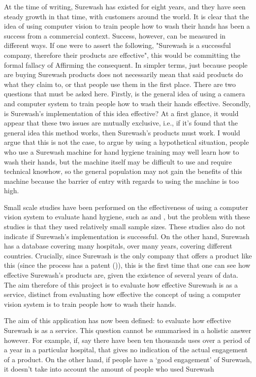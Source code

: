 At the time of writing, Surewash has existed for eight years, and they have seen steady growth in that time, with customers around the world. It is clear that the idea of using computer vision to train people how to wash their hands has been a success from a commercial context. Success, however, can be measured in different ways. If one were to assert the following, "Surewash is a successful company, therefore their products are effective", this would be committing the formal fallacy of Affirming the consequent. In simpler terms, just because people are buying Surewash products does not necessarily mean that said products do what they claim to, or that people use them in the first place. There are two questions that must be asked here. Firstly, is the general idea of using a camera and computer system to train people how to wash their hands effective. Secondly, is Surewash's implementation of this idea effective? At a first glance, it would appear that these two issues are mutually exclusive, i.e., if it's found that the general idea this method works, then Surewash's products must work. I would argue that this is not the case, to argue by using a hypothetical situation, people who use a Surewash machine for hand hygiene training may well learn how to wash their hands, but the machine itself may be difficult to use and require technical knowhow, so the general population may not gain the benefits of this machine because the barrier of entry with regards to using the machine is too high.

Small scale studies have been performed on the effectiveness of using a computer vision system to evaluate hand hygiene, such as \cite{ghosh2011impact} and \cite{ghosh2013pilot}, but the problem with these studies is that they used relatively small sample sizes. These studies also do not indicate if Surewash's implementation is successful. On the other hand, Surewash has a database covering many hospitals, over many years, covering different countries. Crucially, since Surewash is the only company that offers a product like this (since the process has a patent (\cite{handwashpatentglanta})), this is the first time that one can see how effective Surewash's products are, given the existence of several years of data. The aim therefore of this project is to evaluate how effective Surewash is as a service, distinct from evaluating how effective the concept of using a computer vision system is to train people how to wash their hands.

The aim of this application has now been defined: to evaluate how effective Surewash is as a service. This question cannot be summarised in a holistic answer however. For example, if, say there have been ten thousands uses over a period of a year in a particular hospital, that gives no indication of the actual engagement of a product. On the other hand, if people have a `good engagement' of Surewash, it doesn't take into account the amount of people who used Surewash

